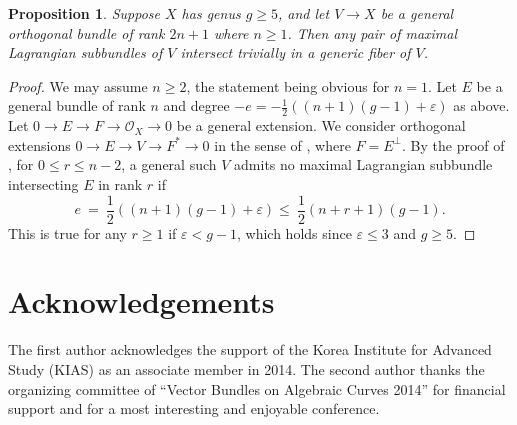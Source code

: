 \documentclass[10pt]{amsart}
\numberwithin{equation}{section}
\newcommand{\ox}{\mathcal{O}_X}
\newtheorem{prop}[theorem]{{\textbf Proposition}}
\begin{document}
\begin{prop} Suppose $X$ has genus $g \ge 5$, and let $V \to X$ be a general orthogonal bundle of rank $2n+1$ where $n \ge 1$. Then any pair of maximal Lagrangian subbundles of $V$ intersect trivially in a generic fiber of $V$.
\end{prop}
\begin{proof}
We may assume $n \ge 2$, the statement being obvious for $n= 1$. Let $E$ be a general bundle of rank $n$ and degree $-e = -\frac{1}{2}((n+1)(g-1)+\varepsilon)$ as above. Let $0 \to E \to F \to \ox \to 0$ be a general extension. We consider orthogonal extensions $0 \to E \to V \to F^* \to 0$ in the sense of \cite[\S 3]{CH4}, where $F = E^\perp$. By the proof of \cite[Proposition 5.5]{CH4}, for $0 \le r \le n-2$, a general such $V$ admits no maximal Lagrangian subbundle intersecting $E$ in rank $r$ if
\[ e \ = \ \frac{1}{2} \left( (n+1)(g-1) + \varepsilon \right) \le \ \frac{1}{2}(n+r+1)(g-1). \]
This is true for any $r \ge 1$ if $\varepsilon < g-1$, which holds since $\varepsilon \le 3$ and $g \ge 5$. \end{proof}

\section*{Acknowledgements}

The first author acknowledges the support of the Korea Institute for Advanced Study (KIAS) as an associate member in 2014. The second author thanks the organizing committee of ``Vector Bundles on Algebraic Curves 2014'' for financial support and for a most interesting and enjoyable conference.

\vspace{0.5cm}
 
\end{document}
